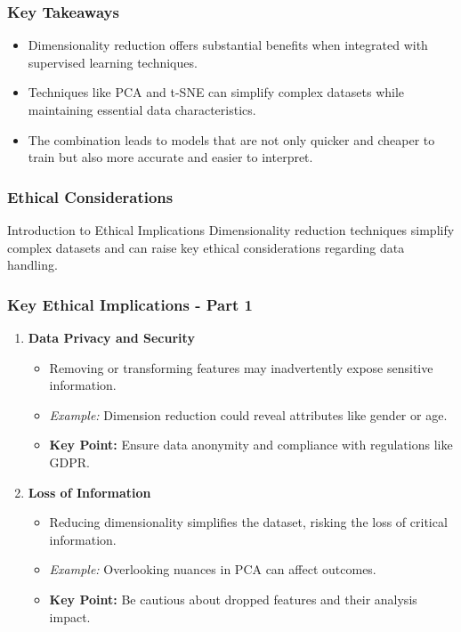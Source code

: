 \documentclass[aspectratio=169]{beamer}
\begin{document}
\begin{frame}[fragile]
    \frametitle{Key Takeaways}
    \begin{itemize}
        \item Dimensionality reduction offers substantial benefits when integrated with supervised learning techniques.
        \item Techniques like PCA and t-SNE can simplify complex datasets while maintaining essential data characteristics.
        \item The combination leads to models that are not only quicker and cheaper to train but also more accurate and easier to interpret.
    \end{itemize}
\end{frame}

\begin{frame}[fragile]
    \frametitle{Ethical Considerations}
    \begin{block}{Introduction to Ethical Implications}
        Dimensionality reduction techniques simplify complex datasets and can raise key ethical considerations regarding data handling.
    \end{block}
\end{frame}

\begin{frame}[fragile]
    \frametitle{Key Ethical Implications - Part 1}
    \begin{enumerate}
        \item \textbf{Data Privacy and Security}
        \begin{itemize}
            \item Removing or transforming features may inadvertently expose sensitive information.
            \item \textit{Example:} Dimension reduction could reveal attributes like gender or age.
            \item \textbf{Key Point:} Ensure data anonymity and compliance with regulations like GDPR.
        \end{itemize}
        
        \item \textbf{Loss of Information}
        \begin{itemize}
            \item Reducing dimensionality simplifies the dataset, risking the loss of critical information.
            \item \textit{Example:} Overlooking nuances in PCA can affect outcomes.
            \item \textbf{Key Point:} Be cautious about dropped features and their analysis impact.
        \end{itemize}
    \end{enumerate}
\end{frame}
\end{document}
